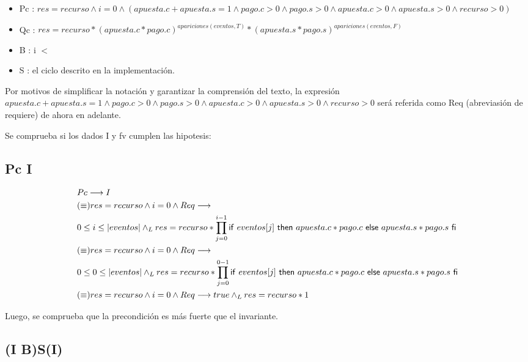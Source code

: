 \documentclass[10pt,a4paper]{article}
\begin{document}
\begin{itemize}
	\item Pc : $res = recurso \land i = 0 \land (apuesta.c + apuesta.s = 1 \land pago.c > 0 \land pago.s > 0 \land apuesta.c > 0 \land apuesta.s > 0 \land recurso > 0)$
	\item Qc : $res = recurso * (apuesta.c * pago.c)^{apariciones(eventos, T)} * (apuesta.s * pago.s)^{apariciones(eventos, F)}$
	\item B : i $<$ 
	\item S : el ciclo descrito en la implementación.
\end{itemize}
   
 Por motivos de simplificar la notación y garantizar la comprensión del texto, la expresión
 $apuesta.c + apuesta.s = 1 \land pago.c > 0 \land pago.s > 0 \land apuesta.c > 0 \land apuesta.s > 0 \land recurso > 0$
 será referida como Req (abreviasión de requiere) de ahora en adelante.
	
\vspace{0.3cm}
   
 Se comprueba si los dados I y fv cumplen las hipotesis:
   
\subsection{Pc \implica I}
   
\begin{equation}
\begin{split}
	& Pc \longrightarrow I \\
	& (\equiv) res = recurso \land i = 0 \land Req  \longrightarrow \\
	& 0 \leq i \leq |eventos| \land _L res = recurso * \prod\limits_{j=0}^{i-1} \mathsf{if}\ eventos[j]\ \mathsf{then}\ apuesta.c * pago.c\ \mathsf{else}\ apuesta.s * pago.s\ \mathsf{fi} \\
	& (\equiv) res = recurso \land i = 0 \land Req \longrightarrow \\
	& 0 \leq 0 \leq |eventos| \land _L res = recurso * \prod\limits_{j=0}^{0-1} \mathsf{if}\ eventos[j]\ \mathsf{then}\ apuesta.c * pago.c\ \mathsf{else}\ apuesta.s * pago.s\ \mathsf{fi}\\
	& (\equiv) res = recurso \land i = 0 \land Req \longrightarrow true \land _L res = recurso * 1
\end{split}
\end{equation}
   
 Luego, se comprueba que la precondición es más fuerte que el invariante.
   
 \subsection{(I \land B)S(I)}
   
\end{document}

